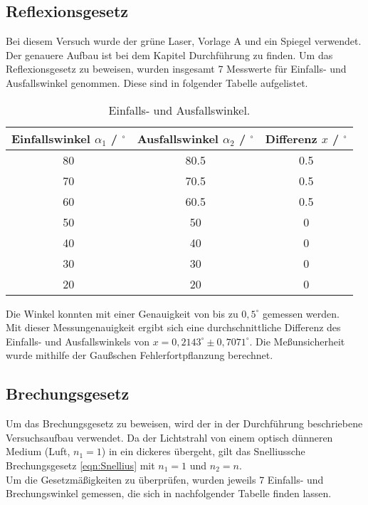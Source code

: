 \subsection{Reflexionsgesetz}
Bei diesem Versuch wurde der grüne Laser, Vorlage A und ein Spiegel verwendet. Der genauere Aufbau ist bei dem Kapitel Durchführung zu finden.
Um das Reflexionsgesetz zu beweisen, wurden insgesamt 7 Messwerte für Einfalls- und Ausfallswinkel genommen. Diese sind in folgender Tabelle
aufgelistet.
\begin{table}
  \centering
  \caption{Einfalls- und Ausfallswinkel.}
  \label{tab:Aufgabe1}
  \begin{tabular}{c c c}
    \toprule
    Einfallswinkel $\alpha_1$ / $^{\circ}$& Ausfallswinkel $\alpha_2$ / $^{\circ}$ & Differenz $x$ / $^{\circ}$\\
    \midrule
    80 & 80.5 & 0.5 \\
    70 & 70.5 & 0.5\\
    60  &60.5 & 0.5\\
    50  &50 & 0\\
    40 & 40 & 0\\
    30 & 30 & 0\\
    20 & 20 & 0\\
    \bottomrule
  \end{tabular}
\end{table}
Die Winkel konnten mit einer Genauigkeit von bis zu $0,5^{\circ}$ gemessen werden. \\
Mit dieser Messungenauigkeit ergibt sich eine durchschnittliche Differenz des Einfalls- und
Ausfallswinkels von $x = 0,2143^{\circ} \pm 0,7071^{\circ}$. Die Meßunsicherheit wurde mithilfe der Gaußschen Fehlerfortpflanzung berechnet.

\subsection{Brechungsgesetz}
Um das Brechungsgesetz zu beweisen, wird der in der Durchführung beschriebene Versuchsaufbau verwendet. Da der Lichtstrahl von einem optisch dünneren
Medium (Luft, $n_1=1$) in ein dickeres übergeht, gilt das Snelliussche Brechungsgesetz \autoref{eqn:Snellius} mit $n_1=1$ und $n_2=n$.\\
Um die Gesetzmäßigkeiten zu überprüfen, wurden jeweils 7 Einfalls- und Brechungswinkel gemessen, die sich in nachfolgender Tabelle finden lassen.

